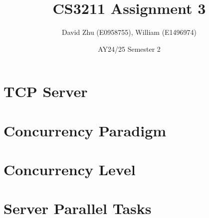 \documentclass[11pt]{article}
\title{CS3211 Assignment 3}
\author{David Zhu (E0958755), William (E1496974)}
\date{AY24/25 Semester 2}
\begin{document}
\maketitle


\section{TCP Server}


\section{Concurrency Paradigm}



\section{Concurrency Level}


\section{Server Parallel Tasks}


\end{document}
